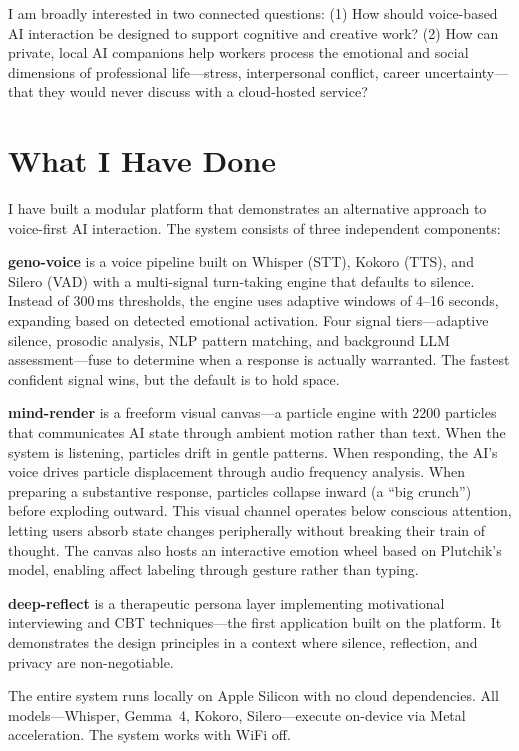 \documentclass[manuscript,anonymous=false]{acmart}
\begin{document}
I am broadly interested in two connected questions: (1) How should voice-based AI interaction be designed to support cognitive and creative work? (2) How can private, local AI companions help workers process the emotional and social dimensions of professional life---stress, interpersonal conflict, career uncertainty---that they would never discuss with a cloud-hosted service?

\section{What I Have Done}

I have built a modular platform that demonstrates an alternative approach to voice-first AI interaction. The system consists of three independent components:

\textbf{geno-voice} is a voice pipeline built on Whisper (STT), Kokoro (TTS), and Silero (VAD) with a multi-signal turn-taking engine that defaults to silence. Instead of 300\,ms thresholds, the engine uses adaptive windows of 4--16 seconds, expanding based on detected emotional activation. Four signal tiers---adaptive silence, prosodic analysis, NLP pattern matching, and background LLM assessment---fuse to determine when a response is actually warranted. The fastest confident signal wins, but the default is to hold space.

\textbf{mind-render} is a freeform visual canvas---a particle engine with 2200 particles that communicates AI state through ambient motion rather than text. When the system is listening, particles drift in gentle patterns. When responding, the AI's voice drives particle displacement through audio frequency analysis. When preparing a substantive response, particles collapse inward (a ``big crunch'') before exploding outward. This visual channel operates below conscious attention, letting users absorb state changes peripherally without breaking their train of thought. The canvas also hosts an interactive emotion wheel based on Plutchik's model, enabling affect labeling through gesture rather than typing.

\textbf{deep-reflect} is a therapeutic persona layer implementing motivational interviewing and CBT techniques---the first application built on the platform. It demonstrates the design principles in a context where silence, reflection, and privacy are non-negotiable.

The entire system runs locally on Apple Silicon with no cloud dependencies. All models---Whisper, Gemma~4, Kokoro, Silero---execute on-device via Metal acceleration. The system works with WiFi off.
\end{document}

